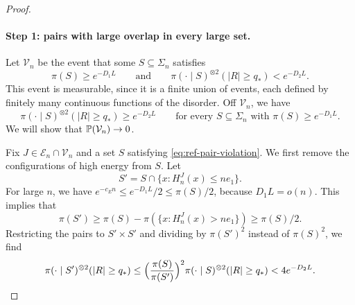 \begin{proof}
\paragraph{Step 1: pairs with large overlap in every large set.}
Let $\mathcal V_n$ be the event that some $S\subseteq\Sigma_n$ satisfies
\begin{equation}\label{eq:ref-pair-violation}
 \pi(S)\ge e^{-D_1L}\qquad\text{and}\qquad
 \pi(\cdot\mid S)^{\otimes2}(|R|\ge q_*)<e^{-D_2L}.
\end{equation}
This event is measurable, since it is a finite union of events, each
defined by finitely many continuous functions of the disorder. Off
$\mathcal V_n$, we have
\begin{equation}\label{b:eq:general-coverage-pairs}
 \pi(\cdot\mid S)^{\otimes2}(|R|\ge q_*)\ge e^{-D_2L}
 \qquad\text{for every }S\subseteq\Sigma_n\text{ with }
 \pi(S)\ge e^{-D_1L}.
\end{equation}
We will show that $\mathbb P(\mathcal V_n)\to0$.

Fix $J\in\mathcal E_n\cap\mathcal V_n$ and a set $S$ satisfying
\eqref{eq:ref-pair-violation}. We first remove the configurations of high
energy from $S$. Let
\[
 S'=S\cap\{x:H_n^J(x)\le ne_1\}.
\]
For large $n$, we have $e^{-c_En}\le e^{-D_1L}/2\le\pi(S)/2$, because
$D_1L=o(n)$. This implies that
\[
 \pi(S')\ge\pi(S)-\pi(\{x:H_n^J(x)>ne_1\})\ge\pi(S)/2 .
\]
Restricting the pairs to $S'\times S'$ and dividing by $\pi(S')^2$ instead of
$\pi(S)^2$, we find
\begin{equation}\label{eq:ref-trimmed}
 \pi(\cdot\mid S')^{\otimes2}(|R|\ge q_*)
 \le\Bigl(\frac{\pi(S)}{\pi(S')}\Bigr)^2
   \pi(\cdot\mid S)^{\otimes2}(|R|\ge q_*)
 <4e^{-D_2L}.
\end{equation}


\end{proof}
